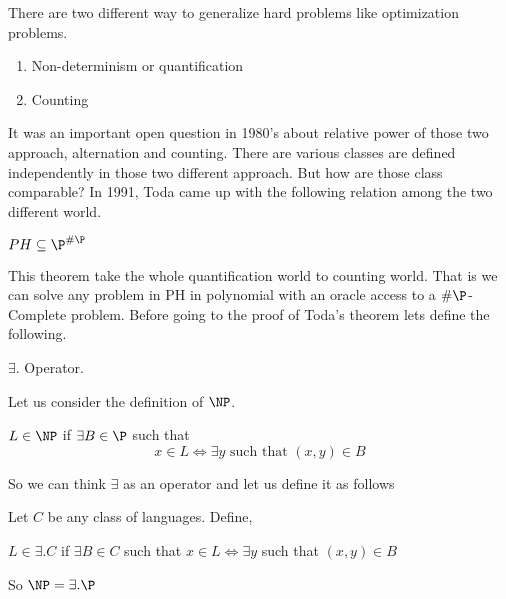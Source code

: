 \documentclass[11pt]{article}
\begin{document}

There are two different way to generalize hard problems like optimization 
problems.
\begin{enumerate}
 \item Non-determinism or quantification
 \item Counting
\end{enumerate}

It was an important open question in 1980's about relative power of those 
two approach, alternation and counting. There are various 
classes are defined independently in those two different approach. But how 
are those class comparable? In 1991, Toda came up with the following relation 
among the two different world.

\begin{theorem}
 $PH \subseteq \P^{\#\P}$
\end{theorem}
This theorem take the whole quantification world to counting world. That is 
we can solve any problem in PH in polynomial with an oracle access to 
a $\#\P$-Complete problem. Before going to the proof of Toda's theorem lets 
define the following.

\begin{definition}
$\exists.$ Operator.

Let us consider the definition of $\NP$.
\begin{center}
$L \in \NP$ if $ \exists B \in \P$ such that 
\[ x \in L \Longleftrightarrow \exists y \text{ such that } (x,y) \in B \]
\end{center}
\end{definition}
So we can think $\exists$ as an operator and let us define it as follows

Let $C$ be any class of languages. Define, 
\begin{center}
$ L \in \exists.C$  if $\exists B \in C$  such that
$x \in L \Longleftrightarrow \exists y$ such that $(x,y) \in B$
\end{center}
So $\NP = \exists .\P$
\end{document}

